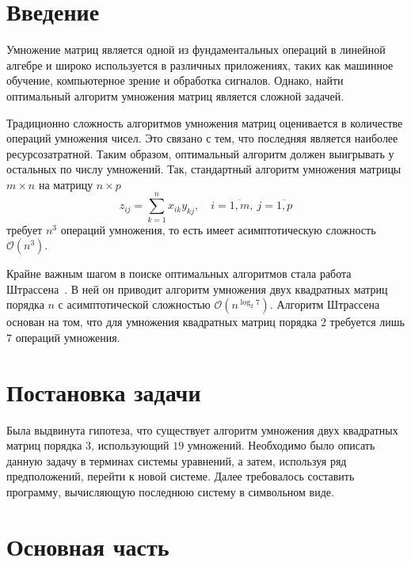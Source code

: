 \documentclass[12pt]{article}
\begin{document}
    \cwPutTitleContents


    \section{Введение}\label{sec:introduction}

    Умножение матриц является одной из фундаментальных операций в линейной алгебре и широко используется в различных
    приложениях, таких как машинное обучение, компьютерное зрение и обработка сигналов.
    Однако, найти оптимальный алгоритм умножения матриц является сложной задачей.

    Традиционно сложность алгоритмов умножения матриц оценивается в количестве операций умножения чисел.
    Это связано с тем, что последняя является наиболее ресурсозатратной.
    Таким образом, оптимальный алгоритм должен выигрывать у остальных по числу умножений.
    Так, стандартный алгоритм умножения матрицы $ m \times n $ на матрицу $ n \times p $
    \begin{equation}
        z_{ij} = \sum_{k=1}^{n} x_{ik} y_{kj},
        \quad i = \overline{1,m}, \: j = \overline{1,p}\label{eq:1}
    \end{equation}
    требует $ n^3 $ операций умножения, то есть имеет асимптотическую сложность $ \mathcal{O}(n^3) $.

    Крайне важным шагом в поиске оптимальных алгоритмов стала работа Штрассена~\cite{strassen}.
    В ней он приводит алгоритм умножения двух квадратных матриц порядка $ n $ с асимптотической сложностью
    $ \mathcal{O}(n^{\log_2 7}) $.
    Алгоритм Штрассена основан на том, что для умножения квадратных матриц порядка $ 2 $ требуется лишь $ 7 $ операций
    умножения.


    \section{Постановка задачи}\label{sec:problem}

    Была выдвинута гипотеза, что существует алгоритм умножения двух квадратных матриц порядка $ 3 $, использующий $ 19 $
    умножений.
    Необходимо было описать данную задачу в терминах системы уравнений, а затем, используя ряд предположений, перейти к
    новой системе.
    Далее требовалось составить программу, вычисляющую последнюю систему в символьном виде.


    \section{Основная часть}\label{sec:main}
\end{document}
